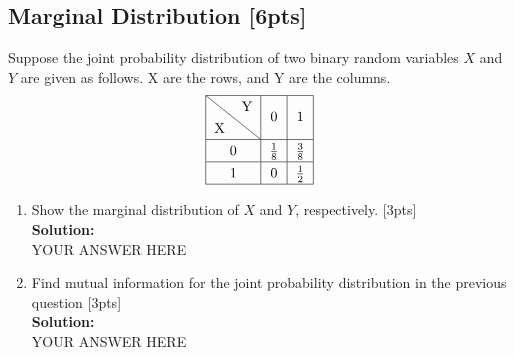 \documentclass{article}
\begin{document}
\subsection{Marginal Distribution [6pts]}
Suppose the joint probability distribution of two binary random variables $X$ and $Y$ are given as follows. X are the rows, and Y are the columns.
$$\renewcommand*{\arraystretch}{1.3}
\begin{tabular}{|c|c|c|}
\hline 
\diagbox{X}{Y} & {0} & {1} \\ 
\hline 0 & {$\frac{1}{8}$} & {$\frac{3}{8}$} \\ 
\hline 1 & {0} & {$\frac{1}{2}$} \\ 
\hline
\end{tabular}$$
\begin{enumerate}[label=(\alph*)]
\item Show the marginal distribution of $X$ and $Y$, respectively. [3pts]\bigskip \\
\textbf{Solution:}\\
YOUR ANSWER HERE
\newpage
\item Find mutual information for the joint probability distribution in the previous question [3pts]\bigskip \\
\textbf{Solution:}\\
YOUR ANSWER HERE
\newpage
\end{enumerate}
\end{document}
